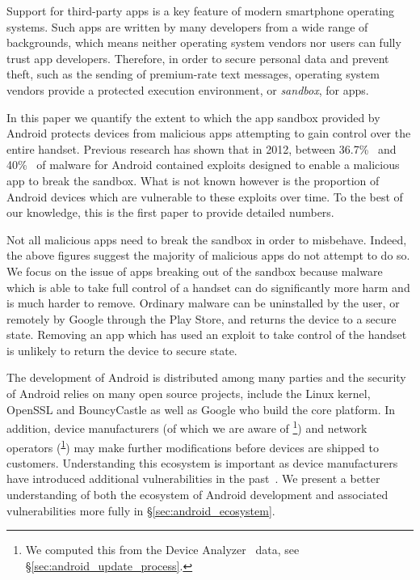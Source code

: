 \documentclass[conference,a4paper,twoside]{IEEEtran}
\newcommand{\da}{Device Analyzer}
\newcommand{\dafoot}{\textsuperscript{\ref{foot:dadata}}}
\newcommand{\percMarketShare}{83.6\%~\footnote{\url{http://www.theinquirer.net/inquirer/news/2379036/android-hits-836-percent-marketshare-while-ios-windows-and-blackberry-slide}}}
\begin{document}
Support for third-party apps is a key feature of modern smartphone operating systems.
Such apps are written by many developers from a wide range of backgrounds, which means neither operating system vendors nor users can fully trust app developers.
Therefore, in order to secure personal data and prevent theft, such as the sending of premium-rate text messages, operating system vendors provide a protected execution environment, or \emph{sandbox}, for apps.

In this paper we quantify the extent to which the app sandbox provided by Android protects devices from malicious apps attempting to gain control over the entire handset.
Previous research has shown that in 2012, between 36.7\%~\cite{Zhou2012b} and 40\%~\cite{Zhou2012a} of malware for Android contained exploits designed to enable a malicious app to break the sandbox.
What is not known however is the proportion of Android devices which are vulnerable to these exploits over time.
To the best of our knowledge, this is the first paper to provide detailed numbers.

Not all malicious apps need to break the sandbox in order to misbehave.
Indeed, the above figures suggest the majority of malicious apps do not attempt to do so.
We focus on the issue of apps breaking out of the sandbox because malware which is able to take full control of a handset can do significantly more harm and is much harder to remove.
Ordinary malware can be uninstalled by the user, or remotely by Google through the Play Store, and returns the device to a secure state. 
Removing an app which has used an exploit to take control of the handset is unlikely to return the device to secure state.

The development of Android is distributed among many parties and the security of Android relies on many open source projects, include the Linux kernel, OpenSSL and BouncyCastle as well as Google who build the core platform. 
In addition, device manufacturers (of which we are aware of \daNumManufacturers\footnote{\label{foot:dadata}We computed this from the \da~\cite{Wagner2013} data, see \S\ref{sec:android_update_process}.}) and network operators (\daNumOperators\dafoot) may make further modifications before devices are shipped to customers. 
Understanding this ecosystem is important as device manufacturers have introduced additional vulnerabilities in the past~\cite{Grace2012}. 
We present a better understanding of both the ecosystem of Android development and associated vulnerabilities more fully in \S\ref{sec:android_ecosystem}.
 
\end{document}

